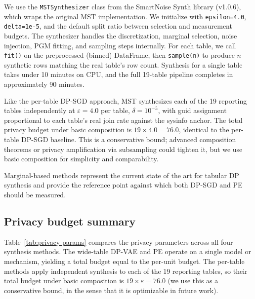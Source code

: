 \documentclass[12pt,letterpaper]{article}
\renewcommand{\_}{\textunderscore\allowbreak}
\begin{document}
We use the \texttt{MSTSynthesizer} class from the SmartNoise Synth library (v1.0.6), which wraps the original MST implementation. We initialize with \texttt{epsilon=4.0}, \texttt{delta=1e-5}, and the default split ratio between selection and measurement budgets. The synthesizer handles the discretization, marginal selection, noise injection, PGM fitting, and sampling steps internally. For each table, we call \texttt{fit()} on the preprocessed (binned) DataFrame, then \texttt{sample(n)} to produce $n$ synthetic rows matching the real table's row count. Synthesis for a single table takes under 10 minutes on CPU, and the full 19-table pipeline completes in approximately 90 minutes.

Like the per-table DP-SGD approach, MST synthesizes each of the 19 reporting tables independently at $\varepsilon = 4.0$ per table, $\delta = 10^{-5}$, with guid assignment proportional to each table's real join rate against the sysinfo anchor. The total privacy budget under basic composition is $19 \times 4.0 = 76.0$, identical to the per-table DP-SGD baseline. This is a conservative bound; advanced composition theorems or privacy amplification via subsampling could tighten it, but we use basic composition for simplicity and comparability.

Marginal-based methods represent the current state of the art for tabular DP synthesis \citep{swanberg2025apiaccessllmsuseful} and provide the reference point against which both DP-SGD and PE should be measured.

\subsection{Privacy budget summary}

Table~\ref{tab:privacy-params} compares the privacy parameters across all four synthesis methods. The wide-table DP-VAE and PE operate on a single model or mechanism, yielding a total budget equal to the per-unit budget. The per-table methods apply independent synthesis to each of the 19 reporting tables, so their total budget under basic composition is $19 \times \varepsilon = 76.0$ (we use this as a conservative bound, in the sense that it is optimizable in future work).
\end{document}
